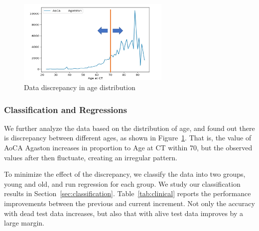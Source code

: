 
\begin{figure}[!h]
    \centering
    \includegraphics[width=0.65\textwidth]{figures/discrepancy.pdf}
    \caption{Data discrepancy in age distribution}
    \label{fig:discrepancy}
\end{figure}

\subsubsection{Classification and Regressions}
We further analyze the data based on the distribution of age, and found out there is discrepancy between different ages, as shown in Figure~\ref{fig:discrepancy}.
That is, the value of AoCA Agaston increases in proportion to Age at CT within 70, but the observed values after then fluctuate, creating an irregular pattern.

To minimize the effect of the discrepancy, we classify the data into two groups, young and old, and run regression for each group.
We study our classification results in Section~\ref{sec:classification}.
Table~\ref{tab:clinical} reports the performance improvements between the previous and current increment.
Not only the accuracy with dead test data increases, but also that with alive test data improves by a large margin.



